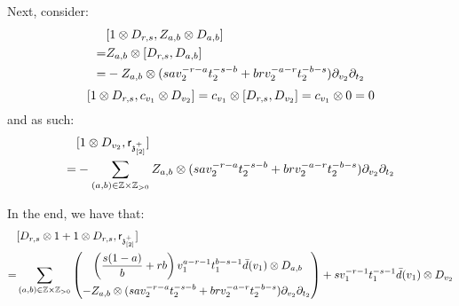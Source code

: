 \begin{remark}
\begin{enumerate}
\begin{enumerate}
\begin{enumerate}
                            Next, consider:
                                $$
                                    \begin{aligned}
                                        & [1 \tensor D_{r, s}, Z_{a, b} \tensor D_{a, b}]
                                        \\
                                        = & Z_{a, b} \tensor [D_{r, s}, D_{a, b}]
                                        \\
                                        = & -Z_{a, b} \tensor ( s a v_2^{-r - a} t_2^{-s - b} + b r v_2^{-a - r} t_2^{-b - s} ) \del_{v_2} \del_{t_2}
                                    \end{aligned}
                                $$
                                $$[1 \tensor D_{r, s}, c_{v_1} \tensor D_{v_2}] = c_{v_1} \tensor [D_{r, s}, D_{v_2}] = c_{v_1} \tensor 0 = 0$$
                            and as such:
                                $$
                                    \begin{aligned}
                                        & [1 \tensor D_{v_2}, \sfr_{\z_{[2]}^+}]
                                        \\
                                        = & -\sum_{(a, b) \in \Z \x \Z_{> 0}} Z_{a, b} \tensor ( s a v_2^{-r - a} t_2^{-s - b} + b r v_2^{-a - r} t_2^{-b - s} ) \del_{v_2} \del_{t_2}
                                    \end{aligned}
                                $$

                            In the end, we have that:
                                $$
                                    \begin{aligned}
                                        & [D_{r, s} \tensor 1 + 1 \tensor D_{r, s}, \sfr_{\z_{[2]}^+}]
                                        \\
                                        = & \sum_{(a, b) \in \Z \x \Z_{> 0}} \left(
                                        \begin{aligned}
                                            & \left( \frac{s(1 - a)}{b} + rb  \right) v_1^{a - r - 1} t_1^{b - s - 1} \bar{d}(v_1) \tensor D_{a, b}
                                            \\
                                            - & Z_{a, b} \tensor ( s a v_2^{-r - a} t_2^{-s - b} + b r v_2^{-a - r} t_2^{-b - s} ) \del_{v_2} \del_{t_2}
                                        \end{aligned} 
                                        \right)
                                        + s v_1^{-r - 1} t_1^{-s - 1} \bar{d}(v_1) \tensor D_{v_2}
                                    \end{aligned}
                                $$
                            

\end{enumerate}
\end{enumerate}
\end{enumerate}
\end{remark}
